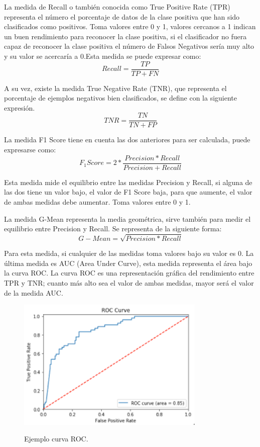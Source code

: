 La medida de Recall o también conocida como True Positive Rate (TPR) representa el número el porcentaje de datos de la clase positiva que han sido clasificados como positivos. Toma valores entre 0 y 1, valores cercanos a 1 indican un buen rendimiento para reconocer la clase positiva, si el clasificador no fuera capaz de reconocer la clase positiva el número de Falsos Negativos sería muy alto y su valor se acercaría a 0.Esta medida se puede expresar como:\newline
$$ Recall = \frac{TP}{TP + FN} $$


A su vez, existe la medida True Negative Rate (TNR), que representa el porcentaje de ejemplos negativos bien clasificados, se define con la siguiente expresión.\newline
$$ TNR = \frac{TN}{TN + FP} $$

La medida F1 Score tiene en cuenta las dos anteriores para ser calculada, puede expresarse como:\newline
$$ F_1 Score = 2 * \frac{Precision*Recall}{Precision+Recall} $$

Esta medida mide el equilibrio entre las medidas Precision y Recall, si alguna de las dos tiene un valor bajo, el valor de F1 Score baja, para que aumente, el valor de ambas medidas debe aumentar. Toma valores entre 0 y 1.\newline

La medida G-Mean representa la media geométrica, sirve también para medir el equilibrio entre Precision y Recall. Se representa de la siguiente forma:\newline
$$ G-Mean = \sqrt{Precision*Recall} $$

Para esta medida, si cualquier de las medidas toma valores bajo su valor es 0.\newline
La última medida es AUC (Area Under Curve), esta medida representa el área bajo la curva ROC. La curva ROC es una representación gráfica del rendimiento entre TPR y TNR; cuanto más alto sea el valor de ambas medidas, mayor será el valor de la medida AUC.\newline

\begin{figure}[h]
	\centering
	\includegraphics[width=90mm]{imagenes/auc.png}
	\label{fig:62}
	\caption{Ejemplo curva ROC.}
\end{figure}
\verticalspace

